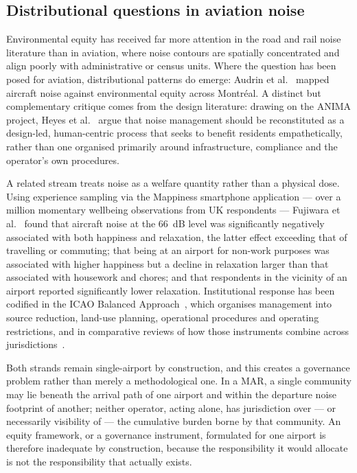 \documentclass[review,12pt]{elsarticle}
\begin{document}
\subsection{Distributional questions in aviation noise}
\label{sec:lr-equity}

Environmental equity has received far more attention in the road and rail noise
literature than in aviation, where noise contours are spatially concentrated and
align poorly with administrative or census units. Where the question has been
posed for aviation, distributional patterns do emerge: Audrin et
al.~\cite{audrin2022aircraft} mapped aircraft noise against environmental equity
across Montréal. A distinct but complementary critique comes from the design
literature: drawing on the ANIMA project, Heyes et al.~\cite{heyes2021case}
argue that noise management should be reconstituted as a design-led,
human-centric process that seeks to benefit residents empathetically, rather
than one organised primarily around infrastructure, compliance and the
operator's own procedures.

A related stream treats noise as a welfare quantity rather than a physical dose.
Using experience sampling via the Mappiness smartphone application --- over a
million momentary wellbeing observations from UK respondents --- Fujiwara et
al.~\cite{fujiwara2017experience} found that aircraft noise at the 66~dB level
was significantly negatively associated with both happiness and relaxation, the
latter effect exceeding that of travelling or commuting; that being at an
airport for non-work purposes was associated with higher happiness but a decline
in relaxation larger than that associated with housework and chores; and that
respondents in the vicinity of an airport reported significantly lower
relaxation. Institutional
response has been codified in the ICAO Balanced Approach~\citep{icao2016balanced},
which organises management into source reduction, land-use planning, operational
procedures and operating restrictions, and in comparative reviews of how those
instruments combine across jurisdictions~\citep{wang2024noise}.

Both strands remain single-airport by construction, and this creates a
governance problem rather than merely a methodological one. In a MAR, a single
community may lie beneath the arrival path of one airport and within the
departure noise footprint of another; neither operator, acting alone, has
jurisdiction over --- or necessarily visibility of --- the cumulative burden
borne by that community. An equity framework, or a governance instrument,
formulated for one airport is therefore inadequate by construction, because the
responsibility it would allocate is not the responsibility that actually exists.
\end{document}
